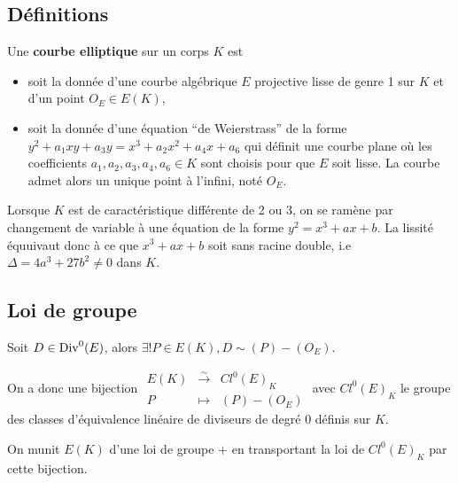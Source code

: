 \subsection{Définitions}

	\begin{defn}
		Une \textbf{courbe elliptique} sur un corps $K$ est 
		\begin{itemize}
			\item[\textbullet] soit la donnée d'une courbe algébrique $E$ projective lisse de genre 1 sur $K$ et d'un point $O_E \in E(K)$,
			\item[\textbullet] soit la donnée d'une équation “de Weierstrass” de la forme $y^2 + a_1 xy + a_3 y = x^3 + a_2 x^2 + a_4 x + a_6$
				qui définit une courbe plane où les coefficients $a_1,a_2,a_3,a_4,a_6 \in K$ sont choisis pour que $E$ soit lisse.
				La courbe admet alors un unique point à l'infini, noté $O_E$.
		\end{itemize}
	\end{defn}
	
	\begin{rem}
		Lorsque $K$ est de caractéristique différente de 2 ou 3, on se ramène par changement de variable à une équation de la forme $y^2 = x^3 + ax + b$.
		La lissité équuivaut donc à ce que $x^3 + ax + b$ soit sans racine double, i.e $\Delta = 4 a^3 + 27 b^2 \neq 0$ dans $K$.
	\end{rem}


\subsection{Loi de groupe}

	\begin{lem}
		Soit $D \in \operatorname{Div}^0(E)$, alors $\exists ! P \in E(K), D \sim (P) - (O_E)$.
	\end{lem}
	
	On a donc une bijection $\begin{array}{rcl} E(K) & \overset{\sim}{\to} & Cl^0 (E)_K \\ P & \mapsto & (P) - (O_E) \end{array}$ avec $Cl^0 (E)_K$ le groupe des classes d'équivalence linéaire de diviseurs de degré 0 définis sur $K$.
	
	\begin{defn}
		On munit $E(K)$ d'une loi de groupe $+$ en transportant la loi de $Cl^0 (E)_K$ par cette bijection.
	\end{defn}
	
